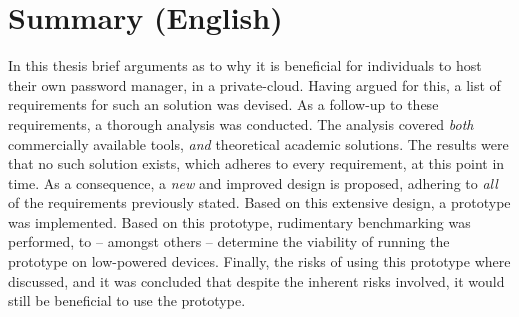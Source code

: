 \chapter{Summary (English)}
	In this thesis brief arguments as to why it is beneficial for individuals to host their own password manager, in a private-cloud. Having argued for this, a list of requirements for such an solution was devised. As a follow-up to these requirements, a thorough analysis was conducted. The analysis covered \emph{both} commercially available tools, \emph{and} theoretical academic solutions. The results were that no such solution exists, which adheres to every requirement, at this point in time.	As a consequence, a \emph{new} and improved design is proposed, adhering to \emph{all} of the requirements previously stated. Based on this extensive design, a prototype was implemented. Based on this prototype, rudimentary benchmarking was performed, to -- amongst others -- determine the viability of running the prototype on low-powered devices. Finally, the risks of using this prototype where discussed, and it was concluded that despite the inherent risks involved, it would still be beneficial to use the prototype.